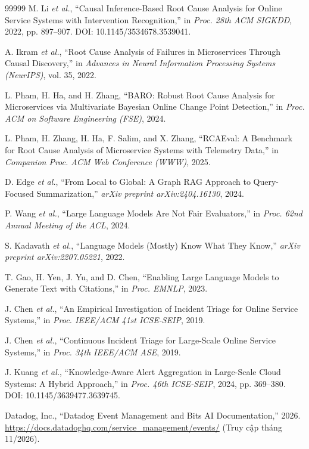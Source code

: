 \documentclass[a4paper,table]{article}
\theoremstyle{definition}
\begin{document}
\begin{thebibliography}{99999}
M. Li \textit{et al.}, ``Causal Inference-Based Root Cause Analysis for Online Service Systems with Intervention Recognition,'' in \textit{Proc. 28th ACM SIGKDD}, 2022, pp. 897--907. DOI: 10.1145/3534678.3539041.

A. Ikram \textit{et al.}, ``Root Cause Analysis of Failures in Microservices Through Causal Discovery,'' in \textit{Advances in Neural Information Processing Systems (NeurIPS)}, vol. 35, 2022.

L. Pham, H. Ha, and H. Zhang, ``BARO: Robust Root Cause Analysis for Microservices via Multivariate Bayesian Online Change Point Detection,'' in \textit{Proc. ACM on Software Engineering (FSE)}, 2024.

L. Pham, H. Zhang, H. Ha, F. Salim, and X. Zhang, ``RCAEval: A Benchmark for Root Cause Analysis of Microservice Systems with Telemetry Data,'' in \textit{Companion Proc. ACM Web Conference (WWW)}, 2025.

D. Edge \textit{et al.}, ``From Local to Global: A Graph RAG Approach to Query-Focused Summarization,'' \textit{arXiv preprint arXiv:2404.16130}, 2024.

P. Wang \textit{et al.}, ``Large Language Models Are Not Fair Evaluators,'' in \textit{Proc. 62nd Annual Meeting of the ACL}, 2024.

S. Kadavath \textit{et al.}, ``Language Models (Mostly) Know What They Know,'' \textit{arXiv preprint arXiv:2207.05221}, 2022.

T. Gao, H. Yen, J. Yu, and D. Chen, ``Enabling Large Language Models to Generate Text with Citations,'' in \textit{Proc. EMNLP}, 2023.

J. Chen \textit{et al.}, ``An Empirical Investigation of Incident Triage for Online Service Systems,'' in \textit{Proc. IEEE/ACM 41st ICSE-SEIP}, 2019.

J. Chen \textit{et al.}, ``Continuous Incident Triage for Large-Scale Online Service Systems,'' in \textit{Proc. 34th IEEE/ACM ASE}, 2019.

J. Kuang \textit{et al.}, ``Knowledge-Aware Alert Aggregation in Large-Scale Cloud Systems: A Hybrid Approach,'' in \textit{Proc. 46th ICSE-SEIP}, 2024, pp. 369--380. DOI: 10.1145/3639477.3639745.

Datadog, Inc., ``Datadog Event Management and Bits AI Documentation,'' 2026. \url{https://docs.datadoghq.com/service_management/events/} (Truy cập tháng 11/2026).


\end{thebibliography}
\end{document}
